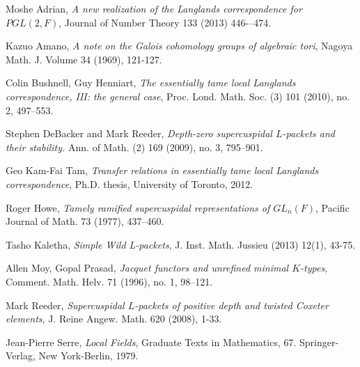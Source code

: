 \documentclass[11pt]{amsart}
\theoremstyle{plain}
\begin{document}
\begin{thebibliography}{9}

  Moshe Adrian,
  \emph{A new realization of the Langlands correspondence for $PGL(2,F)$}, Journal of Number Theory 133 (2013) 446-–474.

  Kazuo Amano,
  \emph{A note on the Galois cohomology groups of algebraic tori}, Nagoya Math. J. Volume 34 (1969), 121-127.

  Colin Bushnell, Guy Henniart,
  \emph{The essentially tame local Langlands correspondence, III: the general case}, Proc. Lond. Math. Soc. (3) 101 (2010), no. 2, 497–553.

  Stephen DeBacker and Mark Reeder,
  \emph{Depth-zero supercuspidal $L$-packets and their stability.}
  Ann. of Math. (2) 169 (2009), no. 3, 795--901.

  Geo Kam-Fai Tam,
  \emph{Transfer relations in essentially tame local Langlands correspondence}, Ph.D. thesis, University of Toronto, 2012.

  Roger Howe,
  \emph{Tamely ramified supercuspidal representations of $GL_n(F)$},
   Pacific Journal of Math.  73  (1977),  437--460.

  Tasho Kaletha, \emph{Simple Wild L-packets}, J. Inst. Math. Jussieu (2013) 12(1), 43-75.

  Allen Moy, Gopal Prasad,
  \emph{Jacquet functors and unrefined minimal $K$-types},
   Comment. Math. Helv. 71 (1996), no. 1, 98--121.

  Mark Reeder,
  \emph{Supercuspidal $L$-packets of positive depth and twisted Coxeter elements},
  J. Reine Angew. Math. 620 (2008), 1-33.

  Jean-Pierre Serre,
  \emph{Local Fields}, Graduate Texts in Mathematics, 67. Springer-Verlag, New York-Berlin, 1979.

\end{thebibliography}
\end{document}
